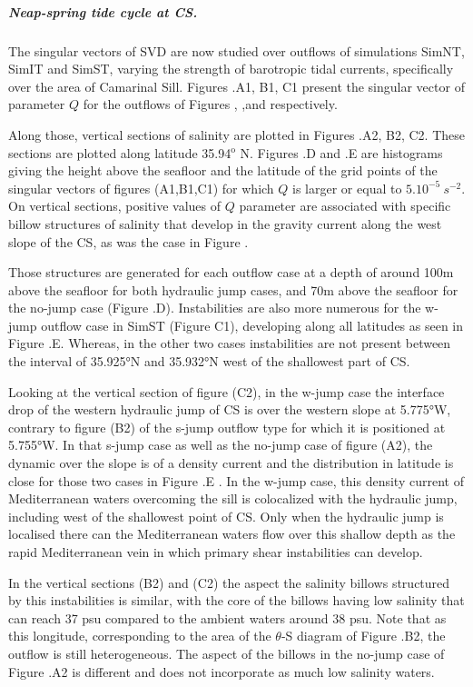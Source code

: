 \subparagraph{Neap-spring tide cycle at CS.}
The singular vectors of SVD are now studied over outflows of simulations SimNT, SimIT and SimST, varying the strength of barotropic tidal currents, specifically over the area of Camarinal Sill. Figures .A1, B1, C1 present the singular vector of parameter $Q$ for the outflows of Figures , ,and  respectively.

Along those, vertical sections of salinity are plotted in Figures .A2, B2, C2. These sections are plotted along latitude 35.94$^\text{o}$ N. Figures .D and .E are histograms giving the height above the seafloor and the latitude of the grid points of the singular vectors of figures (A1,B1,C1) for which $Q$ is larger or equal to $5.10^{-5}\ s^{-2}$. On vertical sections, positive values of $Q$ parameter are associated with specific billow structures of salinity that develop in the gravity current along the west slope of the CS, as was the case in Figure . 

Those structures are generated for each outflow case at a depth of around 100m above the seafloor for both hydraulic jump cases, and 70m above the seafloor for the no-jump case (Figure .D). Instabilities are also more numerous for the w-jump outflow case in SimST (Figure C1), developing along all latitudes as seen in Figure .E. Whereas, in the other two cases instabilities are not present between the interval of 35.925°N and 35.932°N west of the shallowest part of CS.

Looking at the vertical section of figure (C2), in the w-jump case the interface drop of the western hydraulic jump of CS is over the western slope at 5.775°W, contrary to figure (B2) of the s-jump outflow type for which it is positioned at 5.755°W. In that s-jump case as well as the no-jump case of figure (A2), the dynamic over the slope is of a density current\color{red} and the distribution in latitude is close for those two cases in Figure .E \color{black}. In the w-jump case, this density current of Mediterranean waters overcoming the sill is colocalized with the hydraulic jump, including west of the shallowest point of CS. Only when the hydraulic jump is localised there can the Mediterranean waters flow over this shallow depth as the rapid Mediterranean vein in which primary shear instabilities can develop. 

In the vertical sections (B2) and (C2) the aspect the salinity billows structured by this instabilities is similar, with the core of the billows having low salinity that can reach 37 psu compared to the ambient waters around 38 psu. Note that as this longitude, corresponding to the area of the $\theta$-S diagram of Figure .B2, the outflow is still heterogeneous. The aspect of the billows in the no-jump case of Figure .A2 is different and does not incorporate as much low salinity waters.


